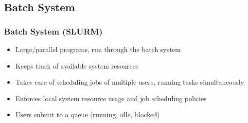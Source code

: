 \subsection{Batch System}

\begin{frame}
	\frametitle{Batch System (SLURM)}

	\begin{itemize}
		\item	Large/parallel programs, run through the batch system
		\item	Keeps track of available system resources
		\item	Takes care of scheduling jobs of multiple users,
				running tasks simultaneously
		\item	Enforces local system resource usage and job scheduling policies
		\item	Users submit to a queue (running, idle, blocked)
	\end{itemize}

\end{frame}

